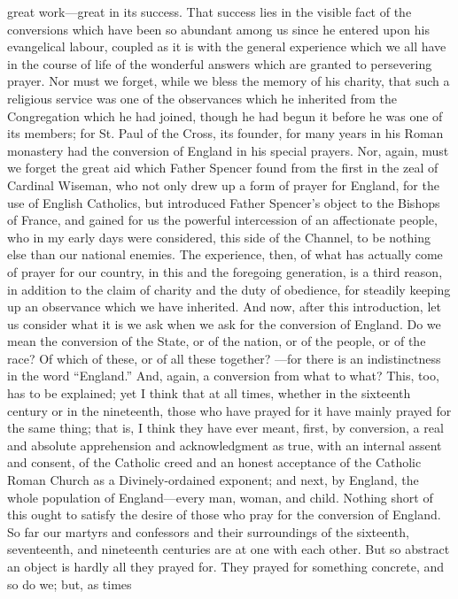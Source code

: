 great work—great in its success. That success lies in the visible
fact of the conversions which have been so abundant among us since he
entered upon his evangelical labour, coupled as it is with the general
experience which we all have in the course of life of the wonderful
answers which are granted to persevering prayer. Nor must we forget,
while we bless the memory of his charity, that such a religious
service was one of the observances which he inherited from the
Congregation which he had joined, though he had begun it before he was
one of its members; for St. Paul of the Cross, its founder, for many
years in his Roman monastery had the conversion of England in his
special prayers. Nor, again, must we forget the great aid which Father
Spencer found from the first in the zeal of Cardinal Wiseman, who not
only drew up a form of prayer for England, for the use of English
Catholics, but introduced Father Spencer's object to the Bishops of
France, and gained for us the powerful intercession of an affectionate
people, who in my early days were considered, this side of the
Channel, to be nothing else than our national enemies. The experience,
then, of what has actually come of prayer for our country, in this and
the foregoing generation, is a third reason, in addition to the claim
of charity and the duty of obedience, for steadily keeping up an
observance which we have inherited. And now, after this introduction,
let us consider what it is we ask when we ask for the conversion of
England. Do we mean the conversion of the State, or of the nation, or
of the people, or of the race? Of which of these, or of all these
together? —for there is an indistinctness in the word ``England.''
And, again, a conversion from what to what? This, too, has to be explained; yet I think that at all times, whether in the sixteenth
century or in the nineteenth, those who have prayed for it have mainly
prayed for the same thing; that is, I think they have ever meant,
first, by conversion, a real and absolute apprehension and
acknowledgment as true, with an internal assent and consent, of the
Catholic creed and an honest acceptance of the Catholic Roman Church
as a Divinely-ordained exponent; and next, by England, the whole
population of England—every man, woman, and child. Nothing short of
this ought to satisfy the desire of those who pray for the conversion
of England. So far our martyrs and confessors and their surroundings
of the sixteenth, seventeenth, and nineteenth centuries are at one
with each other. But so abstract an object is hardly all they prayed
for. They prayed for something concrete, and so do we; but, as times

